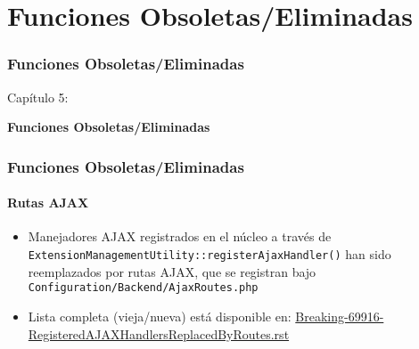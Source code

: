 %

\section{Funciones Obsoletas/Eliminadas}
\begin{frame}[fragile]
	\frametitle{Funciones Obsoletas/Eliminadas}

	\begin{center}\huge{Capítulo 5:}\end{center}
	\begin{center}\huge{\color{typo3darkgrey}\textbf{Funciones Obsoletas/Eliminadas}}\end{center}

\end{frame}


\begin{frame}[fragile]
	\frametitle{Funciones Obsoletas/Eliminadas}
	\framesubtitle{Rutas AJAX}

	\begin{itemize}

		\item Manejadores AJAX registrados en el núcleo a través de
			\texttt{ExtensionManagementUtility::registerAjaxHandler()}
			han sido reemplazados por rutas AJAX, que se registran bajo
			\texttt{ Configuration/Backend/AjaxRoutes.php}

		\item Lista completa (vieja/nueva) está disponible en:\newline
				\href{https://forge.typo3.org/projects/typo3cms-core/repository/revisions/3f0fb6229ba391356e5ed4984eb1c9418ba6663e/entry/typo3/sysext/core/Documentation/Changelog/master/Breaking-69916-RegisteredAJAXHandlersReplacedByRoutes.rst}{Breaking-69916-RegisteredAJAXHandlersReplacedByRoutes.rst}
	\end{itemize}

\end{frame}

